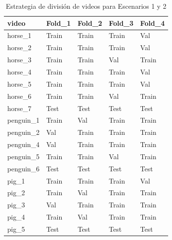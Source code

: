 \begin{table}
\caption{Estrategia de división de videos para Escenarios 1 y 2}
\label{tab:esc3}
\begin{tabular}{lllll}
\toprule
video & Fold_1 & Fold_2 & Fold_3 & Fold_4 \\
\midrule
horse_1 & Train & Train & Train & Val \\
horse_2 & Train & Train & Train & Val \\
horse_3 & Train & Train & Val & Train \\
horse_4 & Train & Train & Train & Val \\
horse_5 & Train & Train & Train & Val \\
horse_6 & Train & Train & Val & Train \\
horse_7 & Test & Test & Test & Test \\
penguin_1 & Train & Val & Train & Train \\
penguin_2 & Val & Train & Train & Train \\
penguin_4 & Val & Train & Train & Train \\
penguin_5 & Train & Train & Val & Train \\
penguin_6 & Test & Test & Test & Test \\
pig_1 & Train & Train & Train & Val \\
pig_2 & Train & Val & Train & Train \\
pig_3 & Val & Train & Train & Train \\
pig_4 & Train & Val & Train & Train \\
pig_5 & Test & Test & Test & Test \\
\bottomrule
\end{tabular}
\end{table}
